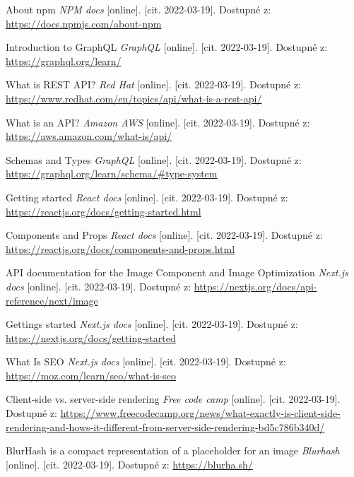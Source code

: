 \begin{thebibliography}{55}
    About npm \textit{NPM docs} [online]. [cit. 2022-03-19]. Dostupné z: \url{https://docs.npmjs.com/about-npm}
    
    Introduction to GraphQL \textit{GraphQL} [online]. [cit. 2022-03-19]. Dostupné z: \url{https://graphql.org/learn/}

    What is REST API? \textit{Red Hat} [online]. [cit. 2022-03-19]. Dostupné z: \url{https://www.redhat.com/en/topics/api/what-is-a-rest-api/}
    
    What is an API? \textit{Amazon AWS} [online]. [cit. 2022-03-19]. Dostupné z: \url{https://aws.amazon.com/what-is/api/}
    
    Schemas and Types \textit{GraphQL} [online]. [cit. 2022-03-19]. Dostupné z: \url{https://graphql.org/learn/schema/#type-system}
    
    Getting started \textit{React docs} [online]. [cit. 2022-03-19]. Dostupné z: \url{https://reactjs.org/docs/getting-started.html}
            
    Components and Props \textit{React docs} [online]. [cit. 2022-03-19]. Dostupné z: \url{https://reactjs.org/docs/components-and-props.html}
    
    API documentation for the Image Component and Image Optimization \textit{Next.js docs} [online]. [cit. 2022-03-19]. Dostupné z: \url{https://nextjs.org/docs/api-reference/next/image}

    Gettings started \textit{Next.js docs} [online]. [cit. 2022-03-19]. Dostupné z: \url{https://nextjs.org/docs/getting-started}
    
    What Is SEO \textit{Next.js docs} [online]. [cit. 2022-03-19]. Dostupné z: \url{https://moz.com/learn/seo/what-is-seo}
    
    Client-side vs. server-side rendering \textit{Free code camp} [online]. [cit. 2022-03-19]. Dostupné z: \url{https://www.freecodecamp.org/news/what-exactly-is-client-side-rendering-and-hows-it-different-from-server-side-rendering-bd5c786b340d/}
    
    BlurHash is a compact representation of a placeholder for an image \textit{Blurhash} [online]. [cit. 2022-03-19]. Dostupné z: \url{https://blurha.sh/}
     

\end{thebibliography}
